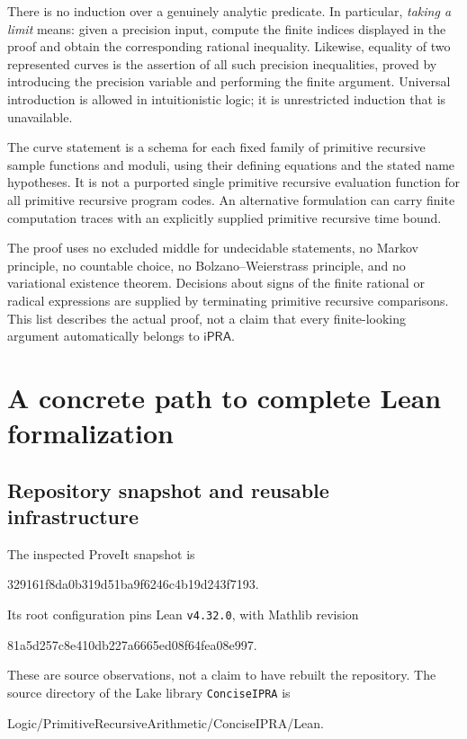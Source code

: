 \documentclass[11pt,a4paper]{article}
\theoremstyle{definition}
\newcommand{\ipra}{\mathsf{iPRA}}
\begin{document}
There is no induction over a genuinely analytic predicate. In
particular, \emph{taking a limit} means: given a precision input,
compute the finite indices displayed in the proof and obtain the
corresponding rational inequality. Likewise, equality of two represented
curves is the assertion of all such precision inequalities, proved by
introducing the precision variable and performing the finite argument.
Universal introduction is allowed in intuitionistic logic; it is
unrestricted induction that is unavailable.

The curve statement is a schema for each fixed family of primitive
recursive sample functions and moduli, using their defining equations
and the stated name hypotheses. It is not a purported single
primitive recursive evaluation function for all primitive recursive
program codes. An alternative formulation can carry finite computation
traces with an explicitly supplied primitive recursive time bound.

The proof uses no excluded middle for undecidable statements, no
Markov principle, no countable choice, no Bolzano--Weierstrass principle,
and no variational existence theorem. Decisions about signs of the
finite rational or radical expressions are supplied by terminating
primitive recursive comparisons. This list describes the actual proof,
not a claim that every finite-looking argument automatically belongs
to \(\ipra\).

\section{A concrete path to complete Lean formalization}
\label{sec:lean}
\subsection{Repository snapshot and reusable infrastructure}
The inspected ProveIt snapshot is
\begin{center}\small\ttfamily
329161f8da0b319d51ba9f6246c4b19d243f7193.
\end{center}
Its root configuration pins Lean \texttt{v4.32.0}, with Mathlib revision
\begin{center}\small\ttfamily
81a5d257c8e410db227a6665ed08f64fea08e997.
\end{center}
These are source observations, not a claim to have rebuilt the
repository. The source directory of the Lake library
\texttt{ConciseIPRA} is
\begin{center}\small\ttfamily
Logic/PrimitiveRecursiveArithmetic/ConciseIPRA/Lean.
\end{center}
\end{document}
